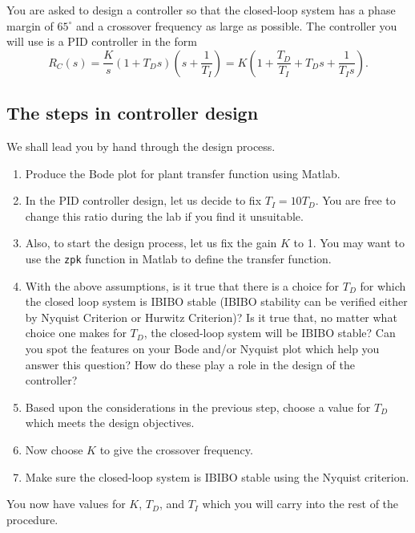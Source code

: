You are asked to design a controller so that the closed-loop system has a
phase margin of $65^{\circ}$ and a crossover frequency as large as possible.
The controller you will use is a PID controller in the form
\begin{equation*}
R_{C}(s)=\frac{K}{s}(1+T_{D}s)(s+\frac{1}{T_{I}})=
K(1+\frac{T_{D}}{T_{I}}+T_{D}s+\frac{1}{T_{I}s}).
\end{equation*}

\subsection{The steps in controller design}

We shall lead you by hand through the design process.
\begin{enumerate}
\item Produce the Bode plot for plant transfer function using
\textsf{Matlab}.

\item In the PID controller design, let us decide to fix $T_{I}=10T_{D}$\@.
You are free to change this ratio during the lab if you find it unsuitable.

\item Also, to start the design process, let us fix the gain $K$ to 1.  You
may want to use the \verb|zpk| function in \textsf{Matlab} to define the
transfer function.

\item With the above assumptions, is it true that there is a choice for
$T_{D}$ for which the closed loop system is IBIBO stable (IBIBO stability can
be verified either by Nyquist Criterion or Hurwitz Criterion)?  Is it true
that, no matter what choice one makes for $T_{D}$\@, the closed-loop system
will be IBIBO stable?  Can you spot the features on your Bode and/or Nyquist
plot which help you answer this question?  How do these play a role in the
design of the controller?

\item Based upon the considerations in the previous step, choose a value for
$T_{D}$ which meets the design objectives.

\item Now choose $K$ to give the crossover frequency.

\item Make sure the closed-loop system is IBIBO stable using the Nyquist
criterion.
\end{enumerate}

You now have values for $K$\@, $T_{D}$\@, and $T_{I}$ which you will carry
into the rest of the procedure.

